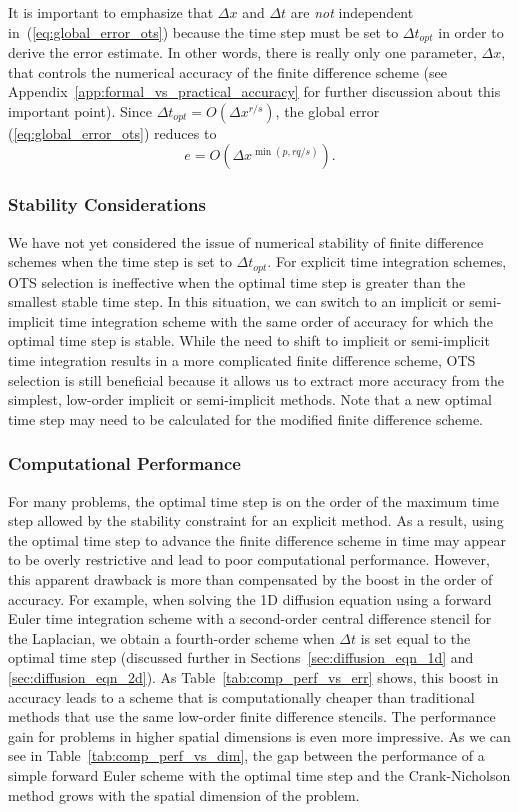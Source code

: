 \documentclass[fleqn,12pt,twoside]{article}
\newcommand{\beq}{\begin{equation}}
\newcommand{\eeq}{\end{equation}}
\def\dt{\Delta t}
\def\dx{\Delta x}
\def\dto{\dt_{opt}}
\begin{document}
It is important to emphasize that $\dx$ and $\dt$ are \emph{not} independent 
in~(\ref{eq:global_error_ots}) because the time step must be set to $\dto$ 
in order to derive the error estimate.  In other words, there is really only 
one parameter, $\dx$, that controls the numerical accuracy of the finite 
difference scheme (see Appendix~\ref{app:formal_vs_practical_accuracy} for 
further discussion about this important point).  Since $\dto = O(\dx^{r/s})$, 
the global error (\ref{eq:global_error_ots}) reduces to
\beq
e = O \left( \dx^{\min(p,rq/s)} \right).
\label{eq:global_error_ots_simplified}
\eeq


\subsubsection*{Stability Considerations}
We have not yet considered the issue of numerical stability of finite
difference schemes when the time step is set to $\dto$.  For explicit time 
integration schemes, OTS selection is ineffective when the optimal time step 
is greater than the smallest stable time step.  In this situation, we can 
switch to an implicit or semi-implicit time integration scheme with the 
same order of accuracy for which the optimal time step is stable.  
While the need to shift to implicit or semi-implicit time integration results 
in a more complicated finite difference scheme, OTS selection is still 
beneficial because it allows us to extract more accuracy from the simplest, 
low-order implicit or semi-implicit methods.
Note that a new optimal time step may need to be calculated for the modified 
finite difference scheme.


\subsubsection*{\label{sec:computational_performance} 
                Computational Performance}
For many problems, the optimal time step is on the order of the maximum 
time step allowed by the stability constraint for an explicit method.  
As a result, using the optimal time step to advance the finite
difference scheme in time may appear to be overly restrictive and lead to poor 
computational performance.  However, this apparent drawback is more than 
compensated by the boost in the order of accuracy.  For example, when solving 
the 1D diffusion equation using a forward Euler time integration scheme with a 
second-order central difference stencil for the Laplacian, we obtain a 
fourth-order scheme when $\dt$ is set equal to the optimal time step 
(discussed further in Sections~\ref{sec:diffusion_eqn_1d} and
\ref{sec:diffusion_eqn_2d}).  
As Table~\ref{tab:comp_perf_vs_err} shows, this boost in accuracy leads to a
scheme that is computationally cheaper than traditional methods that use 
the same low-order finite difference stencils.  The performance gain for 
problems in higher spatial dimensions is even more impressive.  As we can see 
in Table~\ref{tab:comp_perf_vs_dim}, the gap between the performance of a
simple forward Euler scheme with the optimal time step and the Crank-Nicholson
method grows with the spatial dimension of the problem.  
\end{document}
